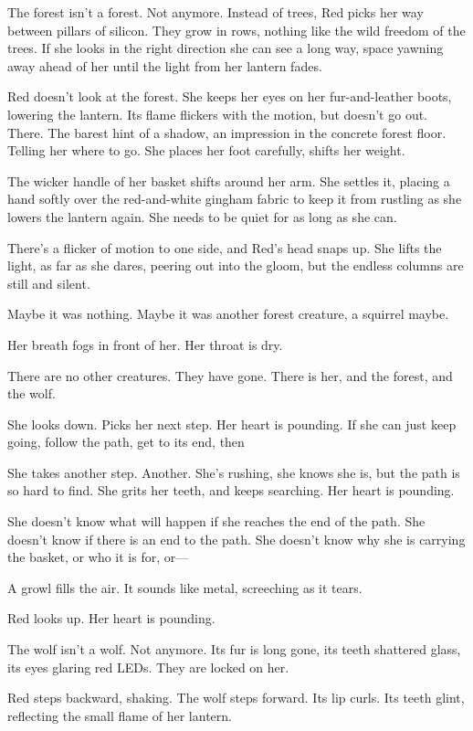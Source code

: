 The forest isn't a forest. Not anymore. Instead of trees, Red picks her way between pillars of silicon. They grow in rows, nothing like the wild freedom of the trees. If she looks in the right direction she can see a long way, space yawning away ahead of her until the light from her lantern fades.

Red doesn't look at the forest. She keeps her eyes on her fur-and-leather boots, lowering the lantern. Its flame flickers with the motion, but doesn't go out. There. The barest hint of a shadow, an impression in the concrete forest floor. Telling her where to go. She places her foot carefully, shifts her weight. 

The wicker handle of her basket shifts around her arm. She settles it, placing a hand softly over the red-and-white gingham fabric to keep it from rustling as she lowers the lantern again. She needs to be quiet for as long as she can.

There's a flicker of motion to one side, and Red's head snaps up. She lifts the light, as far as she dares, peering out into the gloom, but the endless columns are still and silent. 

Maybe it was nothing. Maybe it was another forest creature, a squirrel maybe.

Her breath fogs in front of her. Her throat is dry. 

There are no other creatures. They have gone. There is her, and the forest, and the wolf. 

She looks down. Picks her next step. Her heart is pounding. If she can just keep going, follow the path, get to its end, then\textellipsis

She takes another step. Another. She's rushing, she knows she is, but the path is so hard to find. She grits her teeth, and keeps searching. Her heart is pounding. 

She doesn't know what will happen if she reaches the end of the path. She doesn't know if there is an end to the path. She doesn't know why she is carrying the basket, or who it is for, or---

A growl fills the air. It sounds like metal, screeching as it tears. 

Red looks up. Her heart is pounding. 

The wolf isn't a wolf. Not anymore. Its fur is long gone, its teeth shattered glass, its eyes glaring red LEDs. They are locked on her. 

Red steps backward, shaking. The wolf steps forward. Its lip curls. Its teeth glint, reflecting the small flame of her lantern. 

